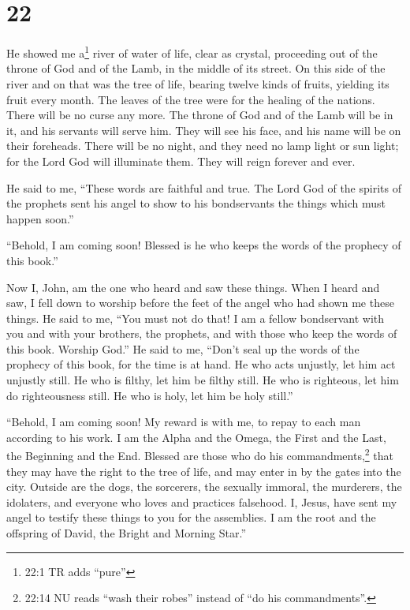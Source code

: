 \hypertarget{section-21}{%
\section{22}\label{section-21}}

 He showed me a\footnote{22:1 TR adds ``pure''} river of
water of life, clear as crystal, proceeding out of the throne of God and
of the Lamb,  in the middle of its street. On this side of
the river and on that was the tree of life, bearing twelve kinds of
fruits, yielding its fruit every month. The leaves of the tree were for
the healing of the nations.  There will be no curse any
more. The throne of God and of the Lamb will be in it, and his servants
will serve him.  They will see his face, and his name will
be on their foreheads.  There will be no night, and they
need no lamp light or sun light; for the Lord God will illuminate them.
They will reign forever and ever.

 He said to me, ``These words are faithful and true. The
Lord God of the spirits of the prophets sent his angel to show to his
bondservants the things which must happen soon.''

 ``Behold, I am coming soon! Blessed is he who keeps the
words of the prophecy of this book.''

 Now I, John, am the one who heard and saw these things.
When I heard and saw, I fell down to worship before the feet of the
angel who had shown me these things.  He said to me, ``You
must not do that! I am a fellow bondservant with you and with your
brothers, the prophets, and with those who keep the words of this book.
Worship God.''  He said to me, ``Don't seal up the words of
the prophecy of this book, for the time is at hand.  He who
acts unjustly, let him act unjustly still. He who is filthy, let him be
filthy still. He who is righteous, let him do righteousness still. He
who is holy, let him be holy still.''

 ``Behold, I am coming soon! My reward is with me, to repay
to each man according to his work.  I am the Alpha and the
Omega, the First and the Last, the Beginning and the End. 
Blessed are those who do his commandments,\footnote{22:14 NU reads
  ``wash their robes'' instead of ``do his commandments''.} that they
may have the right to the tree of life, and may enter in by the gates
into the city.  Outside are the dogs, the sorcerers, the
sexually immoral, the murderers, the idolaters, and everyone who loves
and practices falsehood.  I, Jesus, have sent my angel to
testify these things to you for the assemblies. I am the root and the
offspring of David, the Bright and Morning Star.''

